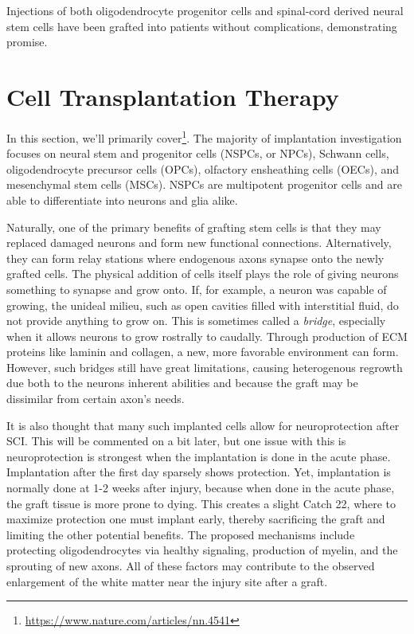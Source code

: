 \documentclass[12pt]{report}
\begin{document}
Injections of both oligodendrocyte progenitor cells and spinal-cord derived neural stem cells have been grafted into patients without complications, demonstrating promise.\newline

\section{Cell Transplantation Therapy}

In this section, we'll primarily cover\footnote{\url{https://www.nature.com/articles/nn.4541}}. The majority of implantation investigation focuses on neural stem and progenitor cells (NSPCs, or NPCs), Schwann cells, oligodendrocyte precursor cells (OPCs), olfactory ensheathing cells (OECs), and mesenchymal stem cells (MSCs). NSPCs are multipotent progenitor cells and are able to differentiate into neurons and glia alike.\newline

Naturally, one of the primary benefits of grafting stem cells is that they may replaced damaged neurons and form new functional connections. Alternatively, they can form relay stations where endogenous axons synapse onto the newly grafted cells. The physical addition of cells itself plays the role of giving neurons something to synapse and grow onto. If, for example, a neuron was capable of growing, the unideal milieu, such as open cavities filled with interstitial fluid, do not provide anything to grow on. This is sometimes called  a \textit{bridge}, especially when it allows neurons to grow rostrally to caudally. Through production of ECM proteins like laminin and collagen, a new, more favorable environment can form. However, such bridges still have great limitations, causing heterogenous regrowth due both to the neurons inherent abilities and because the graft may be dissimilar from certain axon's needs.\newline

It is also thought that many such implanted cells allow for neuroprotection after SCI. This will be commented on a bit later, but one issue with this is neuroprotection is strongest when the implantation is done in the acute phase. Implantation after the first day sparsely shows protection. Yet, implantation is normally done at 1-2 weeks after injury, because when done in the acute phase, the graft tissue is more prone to dying. This creates a slight Catch 22, where to maximize protection one must implant early, thereby sacrificing the graft and limiting the other potential benefits. The proposed mechanisms include protecting oligodendrocytes via healthy signaling, production of myelin, and the sprouting of new axons. All of these factors may contribute to the observed enlargement of the white matter near the injury site after a graft.\newline
\end{document}
